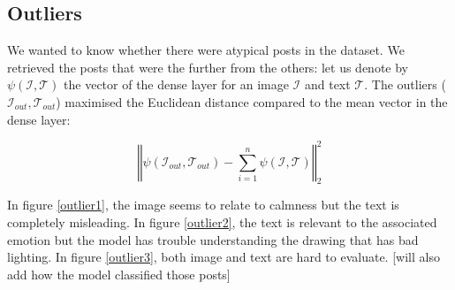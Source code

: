 \documentclass{article} %
\begin{document}
\subsection{Outliers}

We wanted to know whether there were atypical posts in the dataset. We retrieved the posts that were the further from the others: let us denote by $\psi(\mathcal{I}, \mathcal{T})$ the vector of the dense layer for an image $\mathcal{I}$ and text $\mathcal{T}$. The outliers ($\mathcal{I}_{out}, \mathcal{T}_{out}$) maximised the Euclidean distance compared to the mean vector in the dense layer:

\begin{equation}
\left \Vert \psi(\mathcal{I}_{out}, \mathcal{T}_{out}) - \sum_{i=1}^n \psi(\mathcal{I}, \mathcal{T})\right \Vert_2^2
\end{equation}

In figure \ref{outlier1}, the image seems to relate to calmness but the text is completely misleading. In figure \ref{outlier2}, the text is relevant to the associated emotion but the model has trouble understanding the drawing that has bad lighting. In figure \ref{outlier3}, both image and text are hard to evaluate. [will also add how the model classified those posts]
\end{document}
